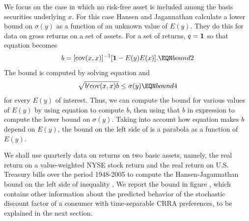 We focus on the case in which  no risk-free
asset is included among the basis securities underlying $x$.  For this case Hansen and Jagannathan  calculate a lower bound on $\sigma(y)$ as a function of
an unknown value
of $E(y)$.
They do this for data on gross returns on a set of assets.
  For a set of returns, $q={\bf 1}$ so that equation 
becomes
$$ b =[{\rm cov}(x,x)]^{-1} [{\bf 1} - E(y) E(x)]. \EQN bound2$$
The bound is computed by solving equation  and
$$ \sqrt{b' {\rm cov} (x,x) b} \leq \sigma(y)\EQN bound4 $$
for every  $E(y)$ of interest.
Thus, we can compute the bound for various values
of $E(y)$ by using equation  to compute $b$, then using
that $b$ in expression  to compute the lower bound on
$\sigma(y)$. Taking into account how equation  makes $b$ depend
on $E(y)$, the bound on the left side of
 is a parabola as a function of $E(y)$.




We shall use  quarterly data on  returns on two basic assets, namely, the real return on a
value-weighted NYSE stock return and the real return on U.S. Treasury bills over the period 1948-2005   to
compute the Hansen-Jagannathan bound on the left side of  inequality  .  We report the bound in figure , which contains other information about the predicted behavior
of the stochastic discount factor of a consumer with time-separable CRRA preferences, to be explained in the next section.





